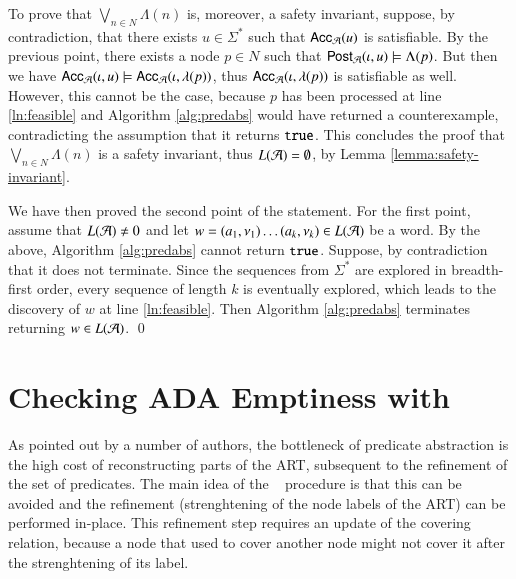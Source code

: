 \documentclass[10pt,conference,letterpaper,twocolumn]{IEEEtran}
\begin{document}
{  To prove that $\bigvee_{n \in N} \Lambda(n)$ is, moreover, a safety
  invariant, suppose, by contradiction, that there exists $u \in
  \Sigma^*$ such that $\mathsf{Acc}_{\mathcal{A}}(u)$ is satisfiable. By the previous
  point, there exists a node $p \in N$ such that $\mathsf{Post}_{\mathcal{A}}(\iota,u)
  \models \Lambda(p)$. But then we have $\mathsf{Acc}_{\mathcal{A}}(\iota,u) \models
  \mathsf{Acc}_{\mathcal{A}}(\iota,\lambda(p))$, thus $\mathsf{Acc}_{\mathcal{A}}(\iota,\lambda(p))$
  is satisfiable as well. However, this cannot be the case, because
  $p$ has been processed at line \ref{ln:feasible} and Algorithm
  \ref{alg:predabs} would have returned a counterexample,
  contradicting the assumption that it returns $\mathtt{true}$. This concludes
  the proof that $\bigvee_{n\in N} \Lambda(n)$ is a safety invariant,
  thus $L(\mathcal{A}) = \emptyset$, by Lemma \ref{lemma:safety-invariant}.

  We have then proved the second point of the statement. For the first
  point, assume that $L(\mathcal{A}) \neq 0$ and let $w = (a_1,\nu_1) \ldots
  (a_k,\nu_k) \in L(\mathcal{A})$ be a word. By the above, Algorithm
  \ref{alg:predabs} cannot return $\mathtt{true}$. Suppose, by contradiction
  that it does not terminate. Since the sequences from $\Sigma^*$ are
  explored in breadth-first order, every sequence of length $k$ is
  eventually explored, which leads to the discovery of $w$ at line
  \ref{ln:feasible}. Then Algorithm \ref{alg:predabs} terminates
  returning $w \in L(\mathcal{A})$. \qed}

\section{Checking ADA Emptiness with \impact}

As pointed out by a number of authors, the bottleneck of predicate
abstraction is the high cost of reconstructing parts of the ART,
subsequent to the refinement of the set of predicates. The main idea
of the \impact~ procedure \cite{mcmillan06} is that this can be
avoided and the refinement (strenghtening of the node labels of the
ART) can be performed in-place. This refinement step requires an
update of the covering relation, because a node that used to cover
another node might not cover it after the strenghtening of its label.
\end{document}
